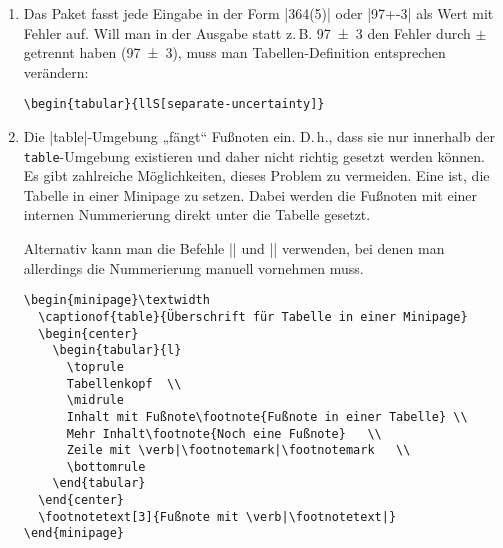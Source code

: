 \begin{enumerate}[label=\alph*)]
\item Das Paket  fasst jede Eingabe in der Form |364(5)| oder |97+-3| als Wert mit Fehler auf. Will man in der Ausgabe statt z.\,B. \num{97(3)} den Fehler durch $\pm$ getrennt haben (\num[separate-uncertainty]{97(3)}), muss man Tabellen-Definition entsprechen verändern:
\begin{lstlisting}
\begin{tabular}{llS[separate-uncertainty]}
\end{lstlisting}

\pagebreak
\item Die |table|-Um\-ge\-bung „fängt“ Fußnoten ein. D.\,h., dass sie nur innerhalb der \verb|table|-Um\-ge\-bung existieren und daher nicht richtig gesetzt werden können.
Es gibt zahlreiche Möglichkeiten, dieses Problem zu vermeiden. Eine ist, die Tabelle in einer Minipage zu setzen. Dabei werden die Fußnoten mit einer internen Nummerierung direkt unter die Tabelle gesetzt.

Alternativ kann man die Befehle |\footnotemark| und |\footnotetext| verwenden, bei denen man allerdings die Nummerierung manuell vornehmen muss.
\begin{lstlisting}
\begin{minipage}\textwidth
  \captionof{table}{Überschrift für Tabelle in einer Minipage}
  \begin{center}
    \begin{tabular}{l}
      \toprule
      Tabellenkopf	\\
      \midrule
      Inhalt mit Fußnote\footnote{Fußnote in einer Tabelle}	\\
      Mehr Inhalt\footnote{Noch eine Fußnote}	\\
      Zeile mit \verb|\footnotemark|\footnotemark	\\
      \bottomrule
    \end{tabular}
  \end{center}
  \footnotetext[3]{Fußnote mit \verb|\footnotetext|}
\end{minipage}
\end{lstlisting}

\end{enumerate}
